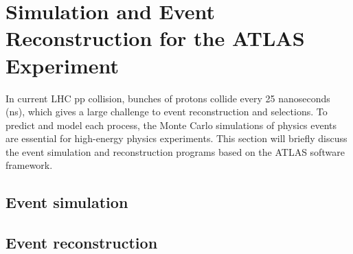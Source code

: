 \chapter{Simulation and Event Reconstruction for the ATLAS Experiment}

In current LHC pp collision, bunches of protons collide every 25 nanoseconds (ns), which gives a large challenge to event reconstruction and selections.
To predict and model each process, the Monte Carlo simulations of physics events are essential for high-energy physics experiments.
This section will briefly discuss the event simulation and reconstruction programs based on the ATLAS software framework. 

\section{Event simulation}
\label{sec:simulation_framework}


\section{Event reconstruction}
\label{sec:reconstruction}


